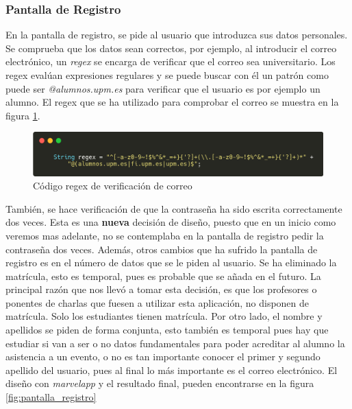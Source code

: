 \subsubsection{Pantalla de Registro}

En la pantalla de registro, se pide al usuario que introduzca sus datos personales. Se comprueba que los datos sean correctos, por ejemplo, al introducir el correo electrónico, un \textit{regex} se encarga de verificar que el correo sea universitario. Los regex evalúan expresiones regulares y se puede buscar con él un patrón como puede ser \textit{@alumnos.upm.es} para verificar que el usuario es por ejemplo un alumno. El regex que se ha utilizado para comprobar el correo se muestra en la figura \ref{fig:regex}. \\

\begin{figure}[h!]
  \centering
  \includegraphics[width=0.9\linewidth]{figs/Desarrollo/Codigo/regex}
  \caption[Código regex de verificación de correo]{Código regex de verificación de correo}
  \label{fig:regex}
\end{figure}

También, se hace verificación de que la contraseña ha sido escrita correctamente dos veces. Esta es una \textbf{nueva} decisión de diseño, puesto que en un inicio como veremos mas adelante, no se contemplaba en la pantalla de registro pedir la contraseña dos veces. Además, otros cambios que ha sufrido la pantalla de registro es en el número de datos que se le piden al usuario. Se ha eliminado la matrícula, esto es temporal, pues es probable que se añada en el futuro. La principal razón que nos llevó a tomar esta decisión, es que los profesores o ponentes de charlas que fuesen a utilizar esta aplicación, no disponen de matrícula. Solo los estudiantes tienen matrícula. Por otro lado, el nombre y apellidos se piden de forma conjunta, esto también es temporal pues hay que estudiar si van a ser o no datos fundamentales para poder acreditar al alumno la asistencia a un evento, o no es tan importante conocer el primer y segundo apellido del usuario, pues al final lo más importante es el correo electrónico. El diseño con \emph{marvelapp} y el resultado final, pueden encontrarse en la figura \ref{fig:pantalla_registro}


